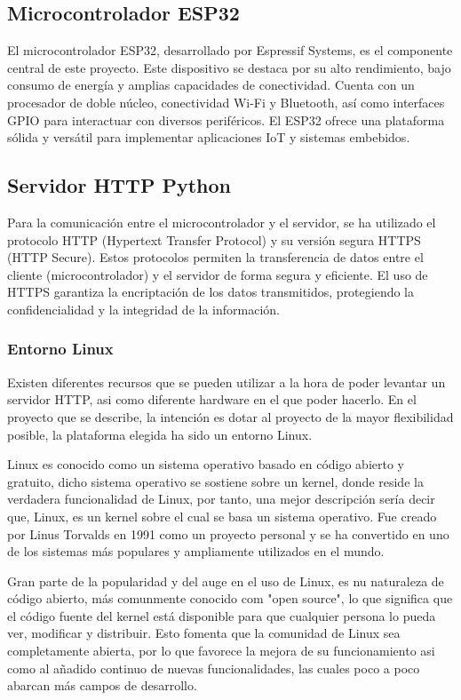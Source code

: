 \subsection{Microcontrolador ESP32}
El microcontrolador ESP32, desarrollado por Espressif Systems, es el componente central de este proyecto. Este dispositivo se destaca por su alto rendimiento, bajo consumo de energía y amplias capacidades de conectividad. Cuenta con un procesador de doble núcleo, conectividad Wi-Fi y Bluetooth, así como interfaces GPIO para interactuar con diversos periféricos. El ESP32 ofrece una plataforma sólida y versátil para implementar aplicaciones IoT y sistemas embebidos.


\subsection{Servidor HTTP Python}
Para la comunicación entre el microcontrolador y el servidor, se ha utilizado el protocolo HTTP (Hypertext Transfer Protocol) y su versión segura HTTPS (HTTP Secure). Estos protocolos permiten la transferencia de datos entre el cliente (microcontrolador) y el servidor de forma segura y eficiente. El uso de HTTPS garantiza la encriptación de los datos transmitidos, protegiendo la confidencialidad y la integridad de la información.

\subsubsection{Entorno Linux}
Existen diferentes recursos que se pueden utilizar a la hora de poder levantar un servidor HTTP, asi como diferente hardware en el que poder hacerlo. En el proyecto que se describe, la intención es dotar al proyecto de la mayor flexibilidad posible, la plataforma elegida ha sido un entorno Linux.

Linux es conocido como un sistema operativo basado en código abierto y gratuito, dicho sistema operativo se sostiene sobre un kernel, donde reside la verdadera funcionalidad de Linux, por tanto, una mejor descripción sería decir que, Linux, es un kernel sobre el cual se basa un sistema operativo. Fue creado por Linus Torvalds en 1991 como un proyecto personal y se ha convertido en uno de los sistemas más populares y ampliamente utilizados en el mundo.

Gran parte de la popularidad y del auge en el uso de Linux, es nu naturaleza de código abierto, más comunmente conocido com "open source", lo que significa que el código fuente del kernel está disponible para que cualquier persona lo pueda ver, modificar y distribuir. Esto fomenta que la comunidad de Linux sea completamente abierta, por lo que favorece la mejora de su funcionamiento asi como al añadido continuo de nuevas funcionalidades, las cuales poco a poco abarcan más campos de desarrollo.

